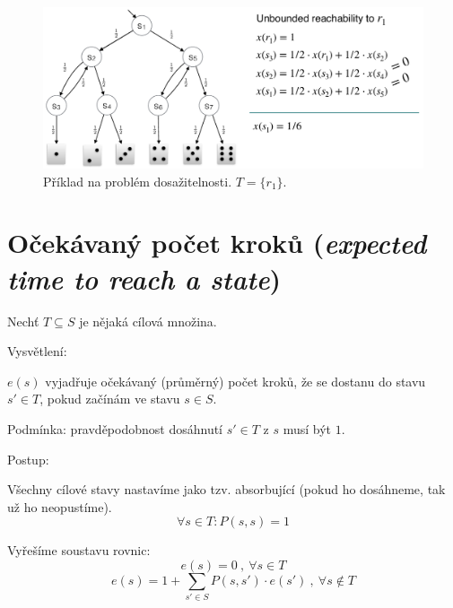 \begin{figure}[H]
    \centering
    \includegraphics[width=1\linewidth]{priklad_4.pdf}
    \caption{Příklad na problém dosažitelnosti. $T = \{ r_1 \}$.}
\end{figure}


\section{Očekávaný počet kroků (\textit{expected time to reach a state})}

\begin{compactitem}
    \item Nechť $T \subseteq S$ je nějaká cílová množina.

    \item Vysvětlení: \begin{compactitem}
        \item $e(s)$ vyjadřuje očekávaný (průměrný) počet kroků, že se dostanu do stavu $s' \in T$, pokud začínám ve stavu $s \in S$.
        \item Podmínka: pravděpodobnost dosáhnutí $s' \in T$ z $s$ musí být $1$.
    \end{compactitem}

    \item Postup: \begin{compactitem}
        \item Všechny cílové stavy nastavíme jako tzv. absorbující (pokud ho dosáhneme, tak už ho neopustíme).
        $$ \forall s \in T : P(s, s) = 1 $$

        \item Vyřešíme soustavu rovnic:
        $$ e(s) = 0 ~,~ \forall s \in T $$
        $$ e(s) = 1 + \sum_{s' \in S} P(s, s') \cdot e(s') ~,~ \forall s \not\in T $$
    \end{compactitem}

\end{compactitem}

